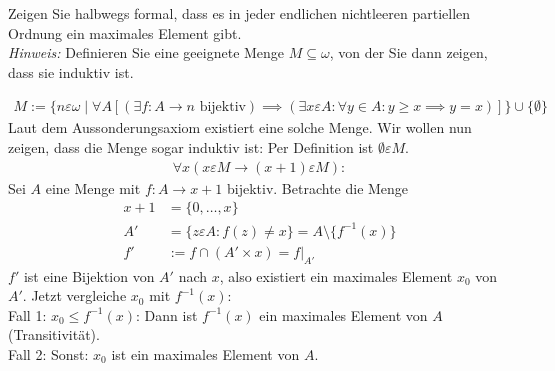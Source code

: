 
\begin{exercise}[268]

Zeigen Sie halbwegs formal, dass es in jeder endlichen nichtleeren partiellen
Ordnung ein maximales Element gibt. \\
\textit{Hinweis:} Definieren Sie eine geeignete Menge $M \subseteq \omega$, von
der Sie dann zeigen, dass sie induktiv ist.

\end{exercise}


\begin{solution}
\begin{align*}
  M := \{n \varepsilon \omega \mid \forall A[ (\exists f: A \to n \text{ bijektiv})
  \implies (\exists x \varepsilon A: \forall y \in A: y \geq x \implies  y = x)]\}
  \cup \{\emptyset\}
\end{align*}
Laut dem Aussonderungsaxiom existiert eine solche Menge.
Wir wollen nun zeigen, dass die Menge sogar induktiv ist:
Per Definition ist $\emptyset \varepsilon M$.
\begin{align*}
  \forall x (x \varepsilon M \rightarrow (x + 1) \varepsilon M):
\end{align*}
Sei $A$ eine Menge mit $f: A \to x + 1$ bijektiv. Betrachte die Menge
\begin{align*}
  x + 1 &= \{0,\dots,x\} \\
  A' &= \{z \varepsilon A: f(z) \neq x\} = A \setminus \{f^{-1}(x)\} \\
  f' &:= f \cap (A' \times x) = f|_{A'}
\end{align*}
$f'$ ist eine Bijektion von $A'$ nach $x$, also existiert ein maximales Element $x_0$ von $A'$.
Jetzt vergleiche $x_0$ mit $f^{-1}(x)$: \\
Fall 1: $x_0 \leq f^{-1}(x)$: Dann ist $f^{-1}(x)$ ein maximales Element von $A$ (Transitivität). \\
Fall 2: Sonst: $x_0$ ist ein maximales Element von $A$.
\end{solution}
